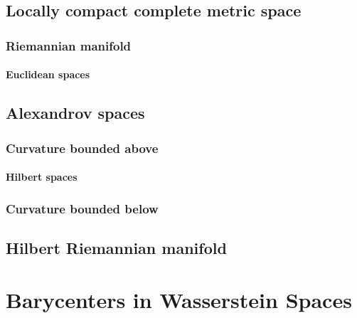 \documentclass{report}
\theoremstyle{remark}
\theoremstyle{definition}
\begin{document}
\chapter{Locally compact complete metric space}

\section{Riemannian manifold}
\subsection{Euclidean spaces}

\chapter{Alexandrov spaces}
\section{Curvature bounded above}
\subsection{Hilbert spaces}
\section{Curvature bounded below}

\chapter{Hilbert Riemannian manifold}

\part{Barycenters in Wasserstein Spaces}

\printbibliography
\end{document}
